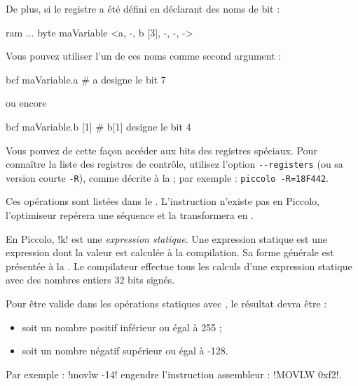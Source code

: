 De plus, si le registre a été défini en déclarant des noms de bit :
\begin{piccolo}
ram ... {
  byte maVariable <a, -, b [3], -, -, ->
}
\end{piccolo}

Vous pouvez utiliser l’un de ces noms comme second argument :
\begin{piccolo}
bcf maVariable.a # a designe le bit 7
\end{piccolo}
ou encore
\begin{piccolo}
bcf maVariable.b [1] # b[1] designe le bit 4
\end{piccolo}

Vous pouvez de cette façon accéder aux bits des registres spéciaux. Pour connaître la liste des registres de contrôle, utilisez l’option \texttt{-{}-registers} (ou sa version courte \texttt{-R}), comme décrite à la  ; par exemple : \texttt{piccolo -R=18F442}.



Ces opérations sont listées dans le . L’instruction  n’existe pas en Piccolo, l’optimiseur repérera une séquence  et la transformera en .

En Piccolo, \pic!k! est une \emph{expression statique}. Une expression statique est une expression dont la valeur est calculée à la compilation. Sa forme générale est présentée à la . Le compilateur effectue tous les calculs d'une expression statique avec des nombres entiers 32 bits signés.

Pour être valide dans les opérations statiques avec , le résultat devra être :
\begin{itemize}
  \item soit un nombre positif inférieur ou égal à 255 ;
  \item soit un nombre négatif supérieur ou égal à -128.
\end{itemize}

Par exemple : \pic!movlw -14! engendre l’instruction assembleur : \pic!MOVLW 0xf2!.


